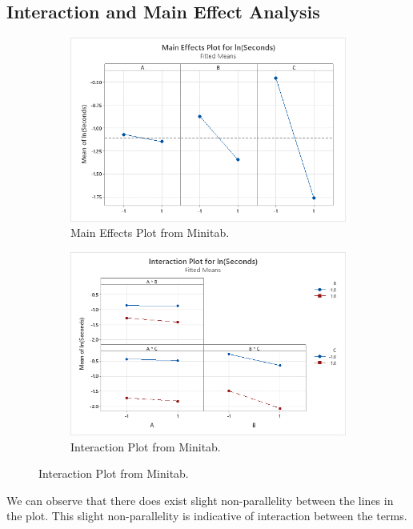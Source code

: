 \documentclass{article}
\begin{document}
\subsection{Interaction and Main Effect Analysis}
\begin{figure}[h]
  \centering
  \begin{subfigure}[b]{0.45\textwidth}
      \includegraphics[width=1\textwidth]{./images/transformed/main.png}
      \caption{Main Effects Plot from Minitab.}
    \label{fig:img1}
  \end{subfigure}
  \begin{subfigure}[b]{0.45\textwidth}
      \includegraphics[width=1\textwidth]{./images/transformed/interaction.png}
      \caption{Interaction Plot from Minitab.}
    \label{fig:img2}
  \end{subfigure}
  \label{fig:both}
\end{figure}
We can observe that there does exist slight non-parallelity between the lines in the plot.
This slight non-parallelity is indicative of interaction between the terms.
\end{document}

